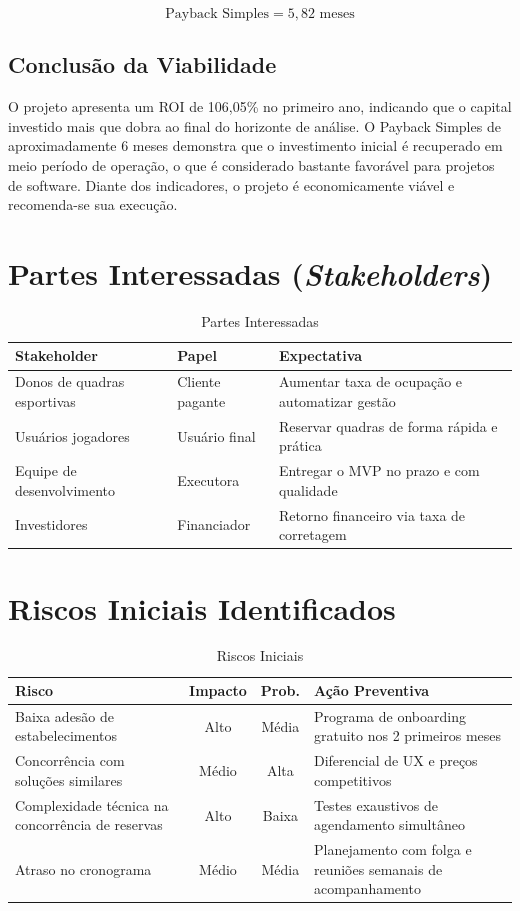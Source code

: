 \documentclass[12pt,a4paper,oneside]{report}
\begin{document}
$$\boxed{\text{Payback Simples} = 5{,}82 \text{ meses}}$$

\subsection{Conclusão da Viabilidade}

O projeto apresenta um ROI de 106,05\% no primeiro ano, indicando que o capital investido mais que dobra ao final do horizonte de análise. O Payback Simples de aproximadamente 6 meses demonstra que o investimento inicial é recuperado em meio período de operação, o que é considerado bastante favorável para projetos de software. Diante dos indicadores, o projeto é economicamente viável e recomenda-se sua execução.

\section{Partes Interessadas (\textit{Stakeholders})}

\begin{table}[htbp]
\centering
\caption{Partes Interessadas}
\begin{tabular}{p{4cm} p{3cm} p{6.5cm}}
\toprule
\textbf{Stakeholder} & \textbf{Papel} & \textbf{Expectativa} \\
\midrule
Donos de quadras esportivas & Cliente pagante & Aumentar taxa de ocupação e automatizar gestão \\
Usuários jogadores & Usuário final & Reservar quadras de forma rápida e prática \\
Equipe de desenvolvimento & Executora & Entregar o MVP no prazo e com qualidade \\
Investidores & Financiador & Retorno financeiro via taxa de corretagem \\
\bottomrule
\end{tabular}
\end{table}

\section{Riscos Iniciais Identificados}

\begin{table}[htbp]
\centering
\caption{Riscos Iniciais}
\begin{tabular}{p{3.5cm} c c p{5cm}}
\toprule
\textbf{Risco} & \textbf{Impacto} & \textbf{Prob.} & \textbf{Ação Preventiva} \\
\midrule
Baixa adesão de estabelecimentos & Alto & Média & Programa de onboarding gratuito nos 2 primeiros meses \\
Concorrência com soluções similares & Médio & Alta & Diferencial de UX e preços competitivos \\
Complexidade técnica na concorrência de reservas & Alto & Baixa & Testes exaustivos de agendamento simultâneo \\
Atraso no cronograma & Médio & Média & Planejamento com folga e reuniões semanais de acompanhamento \\
\bottomrule
\end{tabular}
\end{table}
\end{document}
